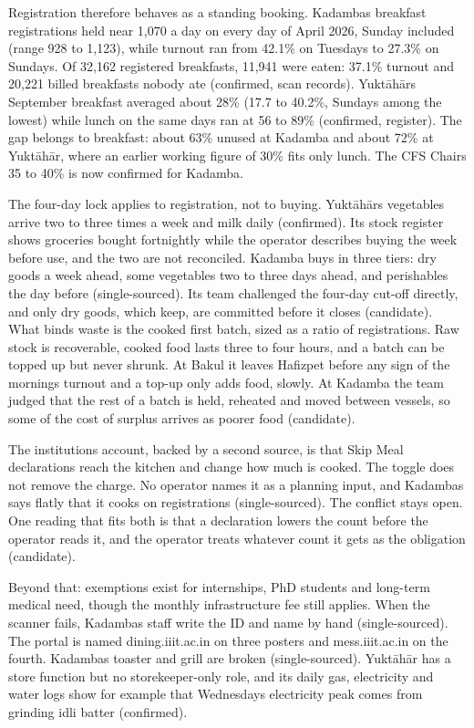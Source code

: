 \documentclass[
  10pt,
  table]{article}
\begin{document}
Registration therefore behaves as a standing booking. Kadamba\textquotesingle s breakfast registrations held near 1,070 a day on every day of April 2026, Sunday included (range 928 to 1,123), while turnout ran from 42.1\% on Tuesdays to 27.3\% on Sundays. Of 32,162 registered breakfasts, 11,941 were eaten: 37.1\% turnout and 20,221 billed breakfasts nobody ate (confirmed, scan records). Yuktāhār\textquotesingle s September breakfast averaged about 28\% (17.7 to 40.2\%, Sundays among the lowest) while lunch on the same days ran at 56 to 89\% (confirmed, register). The gap belongs to breakfast: about 63\% unused at Kadamba and about 72\% at Yuktāhār, where an earlier working figure of 30\% fits only lunch. The CFS Chair\textquotesingle s 35 to 40\% is now confirmed for Kadamba.

The four-day lock applies to registration, not to buying. Yuktāhār\textquotesingle s vegetables arrive two to three times a week and milk daily (confirmed). Its stock register shows groceries bought fortnightly while the operator describes buying the week before use, and the two are not reconciled. Kadamba buys in three tiers: dry goods a week ahead, some vegetables two to three days ahead, and perishables the day before (single-sourced). Its team challenged the four-day cut-off directly, and only dry goods, which keep, are committed before it closes (candidate). What binds waste is the cooked first batch, sized as a ratio of registrations. Raw stock is recoverable, cooked food lasts three to four hours, and a batch can be topped up but never shrunk. At Bakul it leaves Hafizpet before any sign of the morning\textquotesingle s turnout and a top-up only adds food, slowly. At Kadamba the team judged that the rest of a batch is held, reheated and moved between vessels, so some of the cost of surplus arrives as poorer food (candidate).

The institution\textquotesingle s account, backed by a second source, is that Skip Meal declarations reach the kitchen and change how much is cooked. The toggle does not remove the charge. No operator names it as a planning input, and Kadamba\textquotesingle s says flatly that it cooks on registrations (single-sourced). The conflict stays open. One reading that fits both is that a declaration lowers the count before the operator reads it, and the operator treats whatever count it gets as the obligation (candidate).

Beyond that: exemptions exist for internships, PhD students and long-term medical need, though the monthly infrastructure fee still applies. When the scanner fails, Kadamba\textquotesingle s staff write the ID and name by hand (single-sourced). The portal is named dining.iiit.ac.in on three posters and mess.iiit.ac.in on the fourth. Kadamba\textquotesingle s toaster and grill are broken (single-sourced). Yuktāhār has a store function but no storekeeper-only role, and its daily gas, electricity and water logs show for example that Wednesday\textquotesingle s electricity peak comes from grinding idli batter (confirmed).
\end{document}
